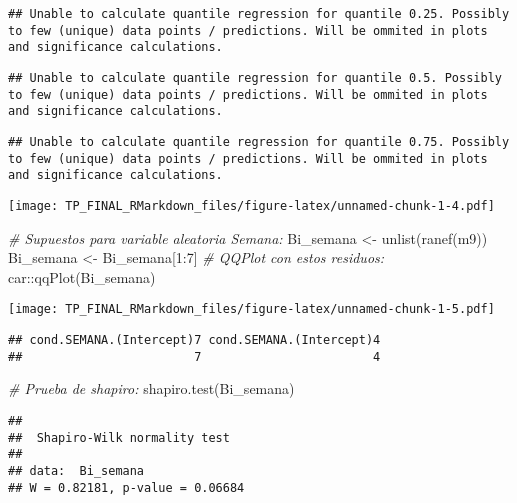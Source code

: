 \documentclass[
]{article}
\newenvironment{Shaded}{\begin{snugshade}}{\end{snugshade}}
\newcommand{\CommentTok}[1]{\textcolor[rgb]{0.56,0.35,0.01}{\textit{#1}}}
\newcommand{\DecValTok}[1]{\textcolor[rgb]{0.00,0.00,0.81}{#1}}
\newcommand{\FunctionTok}[1]{\textcolor[rgb]{0.00,0.00,0.00}{#1}}
\newcommand{\NormalTok}[1]{#1}
\newcommand{\OtherTok}[1]{\textcolor[rgb]{0.56,0.35,0.01}{#1}}
\newcommand{\SpecialCharTok}[1]{\textcolor[rgb]{0.00,0.00,0.00}{#1}}
\begin{document}
\begin{verbatim}
## Unable to calculate quantile regression for quantile 0.25. Possibly to few (unique) data points / predictions. Will be ommited in plots and significance calculations.
\end{verbatim}

\begin{verbatim}
## Unable to calculate quantile regression for quantile 0.5. Possibly to few (unique) data points / predictions. Will be ommited in plots and significance calculations.
\end{verbatim}

\begin{verbatim}
## Unable to calculate quantile regression for quantile 0.75. Possibly to few (unique) data points / predictions. Will be ommited in plots and significance calculations.
\end{verbatim}

\texttt{[image: TP\_FINAL\_RMarkdown\_files/figure-latex/unnamed-chunk-1-4.pdf]}

\begin{Shaded}
\begin{Highlighting}[]
\CommentTok{\# Supuestos para variable aleatoria Semana:}
\NormalTok{Bi\_semana }\OtherTok{\textless{}{-}} \FunctionTok{unlist}\NormalTok{(}\FunctionTok{ranef}\NormalTok{(m9))}
\NormalTok{Bi\_semana }\OtherTok{\textless{}{-}}\NormalTok{ Bi\_semana[}\DecValTok{1}\SpecialCharTok{:}\DecValTok{7}\NormalTok{]}
\CommentTok{\# QQPlot con estos residuos:}
\NormalTok{car}\SpecialCharTok{::}\FunctionTok{qqPlot}\NormalTok{(Bi\_semana)}
\end{Highlighting}
\end{Shaded}

\texttt{[image: TP\_FINAL\_RMarkdown\_files/figure-latex/unnamed-chunk-1-5.pdf]}

\begin{verbatim}
## cond.SEMANA.(Intercept)7 cond.SEMANA.(Intercept)4 
##                        7                        4
\end{verbatim}

\begin{Shaded}
\begin{Highlighting}[]
\CommentTok{\# Prueba de shapiro:}
\FunctionTok{shapiro.test}\NormalTok{(Bi\_semana)}
\end{Highlighting}
\end{Shaded}

\begin{verbatim}
## 
##  Shapiro-Wilk normality test
## 
## data:  Bi_semana
## W = 0.82181, p-value = 0.06684
\end{verbatim}
\end{document}
